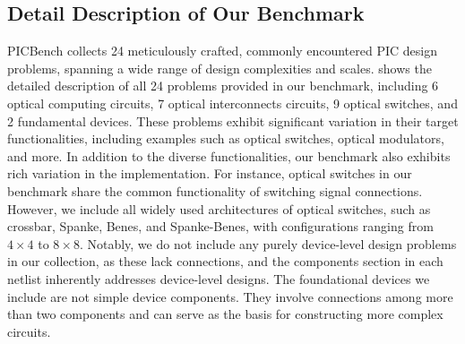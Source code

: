 \subsection{Detail Description of Our Benchmark}
PICBench collects 24 meticulously crafted, commonly encountered PIC design problems, spanning a wide range of design complexities and scales. 
 shows the detailed description of all 24 problems provided in our benchmark, including 6 optical computing circuits, 7 optical interconnects circuits, 9 optical switches, and 2 fundamental devices.
These problems exhibit significant variation in their target functionalities, including examples such as optical switches, optical modulators, and more.
In addition to the diverse functionalities, our benchmark also exhibits rich variation in the implementation. 
For instance, optical switches in our benchmark share the common functionality of switching signal connections. 
However, we include all widely used architectures of optical switches, such as crossbar, Spanke, Benes, and Spanke-Benes, with configurations ranging from $4 \times 4$ to $8 \times 8$.
Notably, we do not include any purely device-level design problems in our collection, as these lack connections, and the components section in each netlist inherently addresses device-level designs.
The foundational devices we include are not simple device components. 
They involve connections among more than two components and can serve as the basis for constructing more complex circuits.

